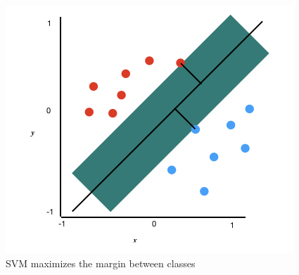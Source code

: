 \begin{figure}[htb!]
    \centering
    \includegraphics[scale=0.75]{files/svm.png}
    \caption{SVM maximizes the margin between classes}
    \label{SVM maximizes the margin between classes}
    \end{figure}
    \FloatBarrier

